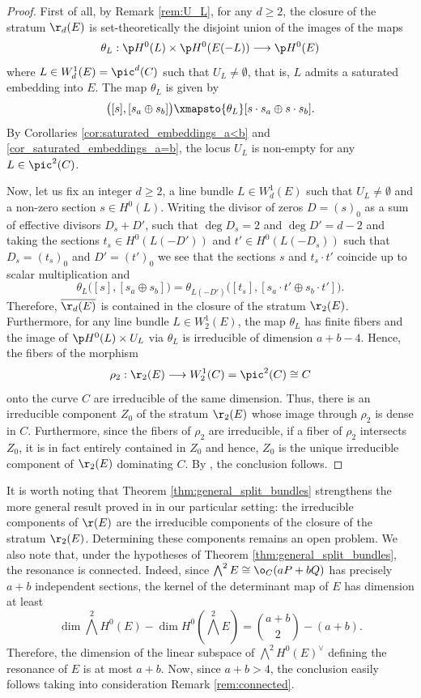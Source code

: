 \documentclass[10pt, leqno]{amsart}
\begin{document}
\begin{proof}
First of all, by Remark \ref{rem:U_L}, for any $d \ge 2$, the closure of the stratum $\r_d(E)$ is set-theoretically the disjoint union of the images of the maps
\[
\theta_L:\p H^0(L)\times \p H^0(E(-L)) \longrightarrow \p H^0(E)
\]
where $L \in W^1_d(E) = \pic^d(C)$ such that $U_L \neq \emptyset$, that is, $L$ admits a saturated embedding into $E$. The map $\theta_L$ is given by
\[
\bigl( [s], [s_a \oplus s_b] \bigr) \xmapsto{\theta_L} [s \cdot s_a \oplus s \cdot s_b].
\]
By Corollaries \ref{cor:saturated_embeddings_a<b} and \ref{cor_saturated_embeddings_a=b}, the locus $U_L$ is non-empty for any $L \in \pic^2(C)$.

Now, let us fix an integer $d \ge 2$, a line bundle $L \in W^1_d(E)$ such that $U_L \neq \emptyset$ and a non-zero section $s \in H^0(L)$. 
Writing the divisor of zeros $D = (s)_0$ as a sum of effective divisors $D_s + D'$, such that $\deg D_s = 2$ and $\deg D' = d - 2$ and taking the sections $t_s \in H^0(L(-D'))$ and $t' \in H^0(L(-D_s))$ such that $D_s = (t_s)_0$ and $D' = (t')_0$ we see that the sections $s$ and $t_s \cdot t'$ coincide up to scalar multiplication and
\[
\theta_L \bigl( [s], [s_a \oplus s_b] \bigr) = \theta_{L(-D')} \bigl( [t_s], [s_a \cdot t' \oplus s_b \cdot t'] \bigr).
\]
Therefore, $\overline{\r_d(E)}$ is contained in the closure of the stratum $\r_2(E)$. 
Furthermore, for any line bundle $L \in W^1_2(E)$, the map $\theta_L$ has finite fibers and the image of $\p H^0(L) \times U_L$ via $\theta_L$ is irreducible of dimension $a + b - 4$. 
Hence, the fibers of the morphism
\[
\rho_2: \r_2(E) \longrightarrow W^1_2(C) = \pic^2(C) \cong C
\]
onto the curve $C$ are irreducible of the same dimension. Thus, there is an irreducible component $Z_0$ of the stratum $\r_2(E)$ whose image through $\rho_2$ is dense in $C$. Furthermore, since the fibers of $\rho_2$ are irreducible, if a fiber of $\rho_2$ intersects $Z_0$, it is in fact entirely contained in $Z_0$ and hence, $Z_0$ is the unique irreducible component of $\r_2(E)$ dominating $C$. By \cite[Theorem 1.25]{shafarevich_2013}, the conclusion follows.
\end{proof}

\begin{rem}
It is worth noting that Theorem \ref{thm:general_split_bundles} strengthens the more general result proved in \cite[Proposition 3.7]{aprodu_linear_2025} in our particular setting: the irreducible components of $\r(E)$ are the irreducible components of the closure of the stratum $\r_2(E)$. Determining these components remains an open problem. We also note that, under the hypotheses of Theorem \ref{thm:general_split_bundles}, the resonance is connected. Indeed, since $\bigwedge^2 E \cong \o_C(aP +bQ)$ has precisely $a+b$ independent sections, the kernel of the determinant map of $E$ has dimension at least
\[
\dim \textstyle{\bigwedge^2}H^0(E) - \dim H^0(\textstyle{\bigwedge^2E}) =  \binom{a+b}{2} - (a+b).
\]
Therefore, the dimension of the linear subspace of $\bigwedge^2H^0(E)^\vee$ defining the resonance of $E$ is at most $a + b$. Now, since $a + b > 4$, the conclusion easily follows taking into consideration Remark \ref{rem:connected}.
\end{rem}
\end{document}
